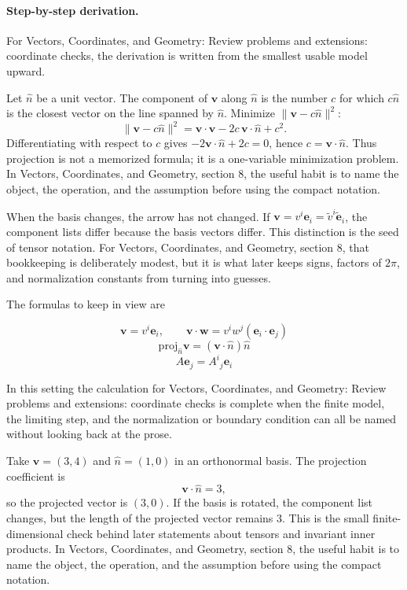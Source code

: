 \paragraph{Step-by-step derivation.}

For Vectors, Coordinates, and Geometry: Review problems and extensions: coordinate checks, the derivation is written from the smallest usable model upward.

Let \(\hat n\) be a unit vector.  The component of \(\bm v\) along \(\hat n\) is the number \(c\) for which \(c\hat n\) is the closest vector on the line spanned by \(\hat n\).  Minimize \(\|\bm v-c\hat n\|^2\):
\[
  \|\bm v-c\hat n\|^2=\bm v\cdot\bm v-2c\,\bm v\cdot\hat n+c^2.
\]
Differentiating with respect to \(c\) gives \(-2\bm v\cdot\hat n+2c=0\), hence \(c=\bm v\cdot\hat n\).  Thus projection is not a memorized formula; it is a one-variable minimization problem.  In Vectors, Coordinates, and Geometry, section 8, the useful habit is to name the object, the operation, and the assumption before using the compact notation.

When the basis changes, the arrow has not changed.  If \(\bm v=v^i\bm e_i=\tilde v^i\tilde{\bm e}_i\), the component lists differ because the basis vectors differ.  This distinction is the seed of tensor notation.  For Vectors, Coordinates, and Geometry, section 8, that bookkeeping is deliberately modest, but it is what later keeps signs, factors of \(2\pi\), and normalization constants from turning into guesses.

The formulas to keep in view are

\[
  \bm v=v^i\bm e_i,\qquad \bm v\cdot\bm w=v^iw^j(\bm e_i\cdot\bm e_j)
\]
\[
  \mathrm{proj}_{\hat n}\bm v=(\bm v\cdot\hat n)\hat n
\]
\[
  A\bm e_j=A^i{}_j\bm e_i
\]

In this setting the calculation for Vectors, Coordinates, and Geometry: Review problems and extensions: coordinate checks is complete when the finite model, the limiting step, and the normalization or boundary condition can all be named without looking back at the prose.




\begin{example}
Take \(\bm v=(3,4)\) and \(\hat n=(1,0)\) in an orthonormal basis.  The projection coefficient is
\[
  \bm v\cdot\hat n=3,
\]
so the projected vector is \((3,0)\).  If the basis is rotated, the component list changes, but the length of the projected vector remains \(3\).  This is the small finite-dimensional check behind later statements about tensors and invariant inner products.  In Vectors, Coordinates, and Geometry, section 8, the useful habit is to name the object, the operation, and the assumption before using the compact notation.
\end{example}



